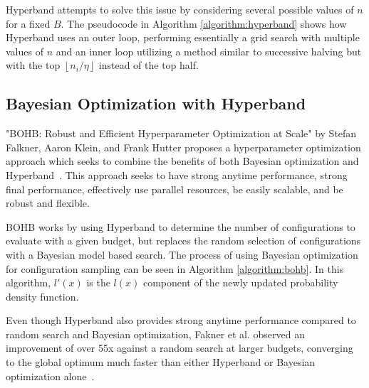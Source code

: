 Hyperband attempts to solve this issue by considering several possible values of $n$ for a fixed $B$.
The pseudocode in Algorithm \ref{algorithm:hyperband} shows how Hyperband uses an outer loop, performing essentially a grid search with multiple values of $n$ and an inner loop utilizing a method similar to successive halving but with the top $\left\lfloor n_i/\eta\right\rfloor$ instead of the top half.



\subsection{Bayesian Optimization with Hyperband}\label{section:background-bohb}
"BOHB: Robust and Efficient Hyperparameter Optimization at Scale" by Stefan Falkner, Aaron Klein, and Frank Hutter proposes a hyperparameter optimization approach which seeks to combine the benefits of both Bayesian optimization and Hyperband~\cite{bohb}.
This approach seeks to have strong anytime performance, strong final performance, effectively use parallel resources, be easily scalable, and be robust and flexible.

BOHB works by using Hyperband to determine the number of configurations to evaluate with a given budget, but replaces the random selection of configurations with a Bayesian model based search.
The process of using Bayesian optimization for configuration sampling can be seen in Algorithm \ref{algorithm:bohb}. In this algorithm, $l'(x)$ is the $l(x)$ component of the newly updated probability density function.

Even though Hyperband also provides strong anytime performance compared to random search and Bayesian optimization, Fakner et al. observed an improvement of over 55x against a random search at larger budgets, converging to the global optimum much faster than either Hyperband or Bayesian optimization alone~\cite{bohb}.

